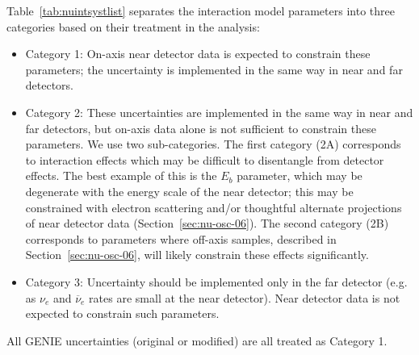 Table~\ref{tab:nuintsystlist} separates the interaction model parameters into three categories based on their treatment in the analysis:
\begin{itemize}
\item Category 1:  On-axis near detector data is expected to constrain these parameters; the uncertainty is implemented in the same way in near and far detectors.
\item Category 2: These uncertainties are implemented in the same way in near and far detectors, but on-axis data alone is not sufficient to constrain these parameters. We use two sub-categories. The first category (2A) corresponds to interaction effects which may be difficult to disentangle from detector effects. The best example of this is the $E_b$ parameter, which may be degenerate with the energy scale of the near detector; this may be constrained with electron scattering and/or thoughtful alternate projections of near detector data (Section~\ref{sec:nu-osc-06}). The second category (2B) corresponds to parameters where off-axis samples, described in Section~\ref{sec:nu-osc-06}, will likely constrain these effects significantly.
\item Category 3: Uncertainty should be implemented only in the far detector (e.g. as $\nu_e$ and $\overline{\nu}_e$ rates are  small at the near detector).  Near detector data is not expected to constrain such parameters.
\end{itemize}
All GENIE uncertainties (original or modified) are all treated as Category 1.

